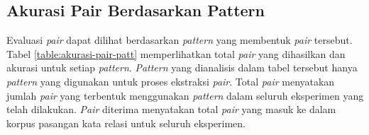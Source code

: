 \subsection{Akurasi Pair Berdasarkan Pattern}
Evaluasi \textit{pair} dapat dilihat berdasarkan \textit{pattern} yang membentuk \textit{pair} tersebut. Tabel \ref{table:akurasi-pair-patt} memperlihatkan total \textit{pair} yang dihasilkan dan akurasi untuk setiap \textit{pattern}. \textit{Pattern} yang dianalisis dalam tabel tersebut hanya \textit{pattern} yang digunakan untuk proses ekstraksi \textit{pair}. Total \textit{pair} menyatakan jumlah \textit{pair} yang terbentuk menggunakan \textit{pattern} dalam seluruh eksperimen yang telah dilakukan. \textit{Pair} diterima menyatakan total \textit{pair} yang masuk ke dalam korpus pasangan kata relasi untuk seluruh eksperimen.

\begin{table}
  \centering
  \caption{Akurasi \textit{pair} berdasarkan \textit{pattern}}
  \label{table:akurasi-pair-patt}
\end{table}

